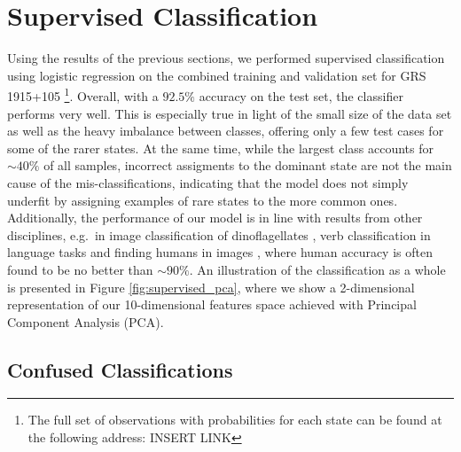 \documentclass[fleqn,usenatbib]{mnras}
\begin{document}
\section{Supervised Classification}
\label{sec:supervised}

Using the results of the previous sections, we performed supervised classification using logistic regression on the combined training and validation set for GRS 1915+105 \footnote{The full set of observations with probabilities for each state can be found at the following address: INSERT LINK}.
Overall, with a $92.5\%$ accuracy on the test set, the classifier performs very well. This is especially true in light of the small size of the data set as well
as the heavy imbalance between classes, offering only a few test cases for some of the rarer states. At the same time, while the largest class accounts for $\sim 40\%$ of all samples,  incorrect assigments to the dominant state are not the main cause of the mis-classifications, indicating that the model does not simply underfit by assigning examples of rare states to the more common ones. Additionally, the performance of our model is in line with results from other disciplines, e.g.\ in image classification of dinoflagellates \citep{culverhouse2003}, verb classification in language tasks \citep{merlo2000} and finding humans in images \citep{quinn2010}, where human accuracy is often found to be no better than 
$\sim 90\%$. An illustration of the classification as a whole is presented in Figure \ref{fig:supervised_pca}, 
where we show a 2-dimensional representation of our 10-dimensional features space achieved with Principal Component Analysis (PCA). 

\subsection{Confused Classifications}
\label{sec:confusion}
\end{document}
